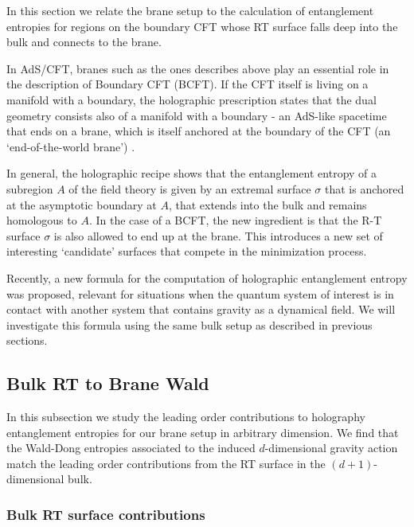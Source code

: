 In this section we relate the brane setup to the calculation of entanglement entropies for regions on the boundary CFT whose RT surface falls deep into the bulk and connects to the brane.

In AdS/CFT, branes such as the ones describes above play an essential role in the description of Boundary CFT (BCFT). If the CFT itself is living on a manifold with a boundary, the holographic prescription states that the dual geometry consists also of a manifold with a boundary - an AdS-like spacetime that ends on a brane, which is itself anchored at the boundary of the CFT (an `end-of-the-world brane') \cite{ads/bcft}.

In general, the holographic recipe shows that the entanglement entropy of a subregion $A$ of the field theory is given by an extremal surface $\sigma$ that is anchored at the asymptotic boundary at $A$, that extends into the bulk and remains homologous to $A$. In the case of a BCFT, the new ingredient is that the R-T surface $\sigma$ is also allowed to end up at the brane. This introduces a new set of interesting `candidate' surfaces that compete in the minimization process.

Recently, a new formula for the computation of holographic entanglement entropy was proposed, relevant for situations when the quantum system of interest is in contact with another system that contains gravity as a dynamical field. We will investigate this formula using the same bulk setup as described in previous sections. 

\subsection{Bulk RT to Brane Wald}\label{sec:genera}

In this subsection we study the leading order contributions to holography entanglement entropies for our brane setup in arbitrary dimension. We find that the Wald-Dong entropies associated to the induced $d$-dimensional gravity action match the leading order contributions from the RT surface in the $(d+1)$-dimensional bulk.


\subsubsection{Bulk RT surface contributions \label{bulkrt}}

